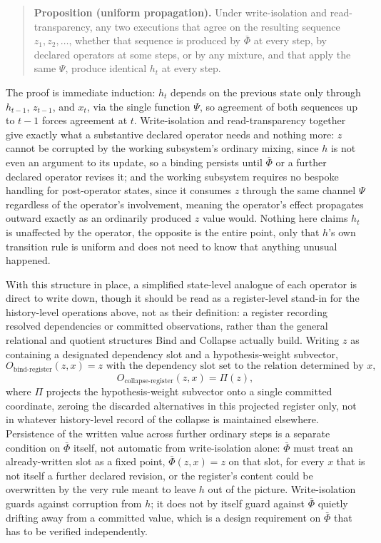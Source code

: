 \documentclass[11pt]{article}
\begin{document}
\begin{quote}
\textbf{Proposition (uniform propagation).} Under write-isolation and read-transparency, any two executions that agree on the resulting sequence $z_1, z_2, \ldots$, whether that sequence is produced by $\bar\Phi$ at every step, by declared operators at some steps, or by any mixture, and that apply the same $\Psi$, produce identical $h_t$ at every step.
\end{quote}

The proof is immediate induction: $h_t$ depends on the previous state only through $h_{t-1}$, $z_{t-1}$, and $x_t$, via the single function $\Psi$, so agreement of both sequences up to $t-1$ forces agreement at $t$. Write-isolation and read-transparency together give exactly what a substantive declared operator needs and nothing more: $z$ cannot be corrupted by the working subsystem's ordinary mixing, since $h$ is not even an argument to its update, so a binding persists until $\bar\Phi$ or a further declared operator revises it; and the working subsystem requires no bespoke handling for post-operator states, since it consumes $z$ through the same channel $\Psi$ regardless of the operator's involvement, meaning the operator's effect propagates outward exactly as an ordinarily produced $z$ value would. Nothing here claims $h_t$ is unaffected by the operator, the opposite is the entire point, only that $h$'s own transition rule is uniform and does not need to know that anything unusual happened.

With this structure in place, a simplified state-level analogue of each operator is direct to write down, though it should be read as a register-level stand-in for the history-level operations above, not as their definition: a register recording resolved dependencies or committed observations, rather than the general relational and quotient structures Bind and Collapse actually build. Writing $z$ as containing a designated dependency slot and a hypothesis-weight subvector,
\[
O_{\mathrm{bind\text{-}register}}(z, x) = z \text{ with the dependency slot set to the relation determined by } x,
\]
\[
O_{\mathrm{collapse\text{-}register}}(z, x) = \Pi(z),
\]
where $\Pi$ projects the hypothesis-weight subvector onto a single committed coordinate, zeroing the discarded alternatives in this projected register only, not in whatever history-level record of the collapse is maintained elsewhere. Persistence of the written value across further ordinary steps is a separate condition on $\bar\Phi$ itself, not automatic from write-isolation alone: $\bar\Phi$ must treat an already-written slot as a fixed point, $\bar\Phi(z,x) = z$ on that slot, for every $x$ that is not itself a further declared revision, or the register's content could be overwritten by the very rule meant to leave $h$ out of the picture. Write-isolation guards against corruption from $h$; it does not by itself guard against $\bar\Phi$ quietly drifting away from a committed value, which is a design requirement on $\bar\Phi$ that has to be verified independently.
\end{document}

